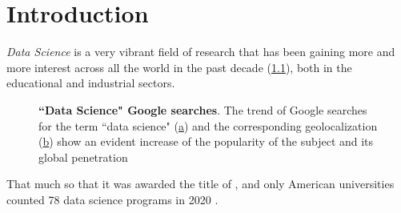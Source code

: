 \chapter{Introduction}
\label{chap:introduction}


\textit{Data Science} is a very vibrant field of research that has been gaining more and more interest across all the world in the past decade (\cref{fig:GoogleTrendsDS}), both in the educational and industrial sectors.
\begin{figure}
\centering
{}

\caption{
\textbf{``Data Science" Google searches}. The trend of Google searches for the term ``data science" (\hyperref[fig:GoogleTrendsDS:ts]{a}) and the corresponding geolocalization (\hyperref[fig:GoogleTrendsDS:map]{b}) show an evident increase of the popularity of the subject and its global penetration
} 
\label{fig:GoogleTrendsDS}
\end{figure}
That much so that it was awarded the title of  \cite{davenport2012sexiest}, and only American universities counted 78 data science programs in 2020 \cite{zhang2021data}.

